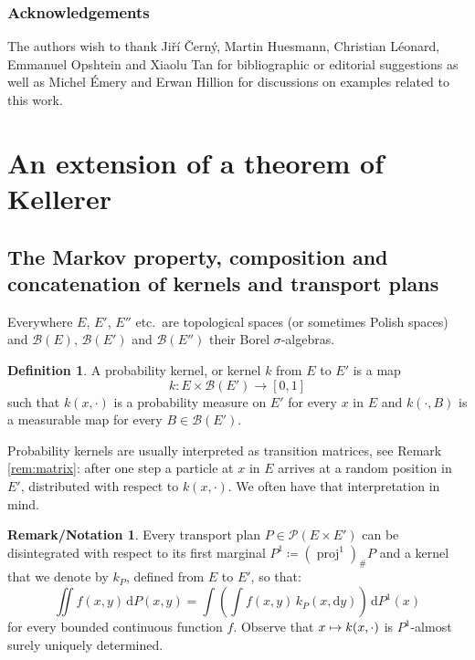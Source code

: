 \documentclass[11pt]{article}
\newcommand\mto{\mathchoice{\longmapsto}{\mapsto}{\mapsto}{\mapsto}}
\theoremstyle{plain}
\theoremstyle{definition}
\newtheorem{defi}[them]{Definition}
\newtheorem{remnotation}[them]{Remark/Notation} %
\newcommand{\dd}{\mathrm{d}}
\newcommand{\eqdefup}{\coloneqq}
\newcommand{\p}{\mathcal{P}}
\newcommand{\pr}{\operatorname{proj}}
\begin{document}
\subsubsection*{Acknowledgements} The authors wish to thank Ji\v rí \v Cern\'y, Martin Huesmann, Christian Léonard, Emmanuel Opshtein and Xiaolu Tan for bibliographic or editorial suggestions as well as Michel Émery and Erwan Hillion for discussions on examples related to this work.

\section{An extension of a theorem of Kellerer}\label{sec:concatenation+kellerer+boujui}

\subsection{The Markov property, composition and concatenation of kernels and transport plans}\label{subsec:kernels_markov}

Everywhere $E$, $E'$, $E''$ etc.\ are topological spaces (or sometimes Polish spaces) and $\mathcal{B}(E)$, $\mathcal{B}(E')$ and $\mathcal{B}(E'')$ their Borel $\sigma$-algebras.

\begin{defi}
A probability kernel, or kernel $k$ from $E$ to $E'$ is a map\vspace*{-3pt}\enlargethispage{.5\baselineskip}%
\[
k:E\times \mathcal{B}(E')\to [0,1]
\]
such that $k(x,\cdot)$ is a probability measure on $E'$ for every $x$ in $E$ and $k(\cdot,B)$ is a measurable map for every $B\in {\mathcal B}(E')$.
\end{defi}

Probability kernels are usually interpreted as transition matrices, see Remark \ref{rem:matrix}: after one step a particle at $x$ in $E$ arrives at a random position in $E'$, distributed with respect to $k(x,\cdot)$. We often have that interpretation in mind.

\begin{remnotation}\label{notation:k_P}Every transport plan $P\in\p(E\times E')$ can be disintegrated with respect to its first marginal $P^1\eqdefup(\pr^1)_\#P$ and a kernel that we denote by $k_P$, defined from $E$ to $E'$, so that:\vspace*{-3pt}
\[\iint f(x,y)\,\dd P(x,y)=\int\left(\int f(x,y)\,k_P(x,\dd y)\right)\,\dd P^1(x)\]
for every bounded continuous function $f$. Observe that $x\mto k(x,\cdot)$ is $P^1$-almost surely uniquely determined.
\end{remnotation}
\end{document}

